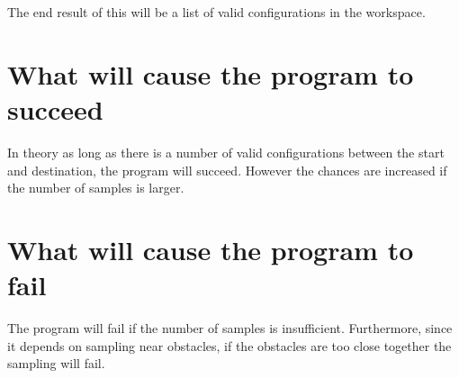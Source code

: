 \documentclass[12pt]{article}
\begin{document}
    The end result of this will be a list of valid configurations in the workspace.

    \section{What will cause the program to succeed}

    In theory as long as there is a number of valid configurations between the start and destination, the program will succeed. However the chances are increased if the number of samples is larger.

    \section{What will cause the program to fail}

    The program will fail if the number of samples is insufficient. Furthermore, since it depends on sampling near obstacles, if the obstacles are too close together the sampling will fail.
\end{document}
